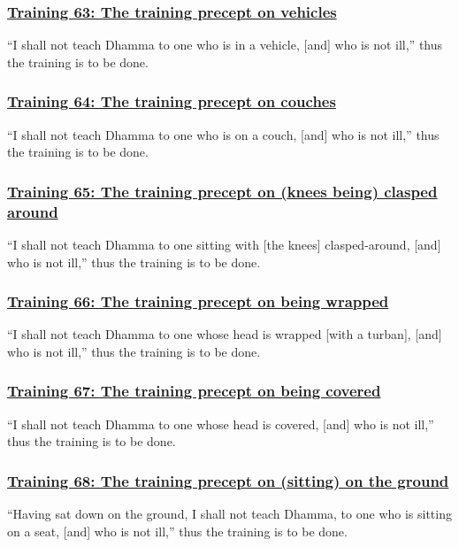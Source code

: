 \subsubsection*{\hyperref[sekh63]{Training 63: The training precept on vehicles}}
\label{training63}
``I shall not teach Dhamma to one who is in a vehicle, [and] who is not ill,'' thus the training is to be done.



\subsubsection*{\hyperref[sekh64]{Training 64: The training precept on couches}}
\label{training64}
``I shall not teach Dhamma to one who is on a couch, [and] who is not ill,'' thus the training is to be done.



\subsubsection*{\hyperref[sekh65]{Training 65: The training precept on (knees being) clasped around}}
\label{training65}
``I shall not teach Dhamma to one sitting with [the knees] clasped-around, [and] who is not ill,'' thus the training is to be done.



\subsubsection*{\hyperref[sekh66]{Training 66: The training precept on being wrapped}}
\label{training66}
``I shall not teach Dhamma to one whose head is wrapped [with a turban], [and] who is not ill,'' thus the training is to be done.



\subsubsection*{\hyperref[sekh67]{Training 67: The training precept on being covered}}
\label{training67}
``I shall not teach Dhamma to one whose head is covered, [and] who is not ill,'' thus the training is to be done.



\subsubsection*{\hyperref[sekh68]{Training 68: The training precept on (sitting) on the ground}}
\label{training68}
``Having sat down on the ground, I shall not teach Dhamma, to one who is sitting on a seat, [and] who is not ill,'' thus the training is to be done.




